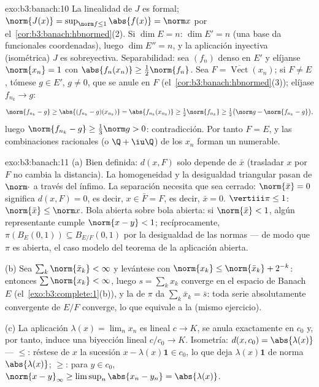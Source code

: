 \begin{solution}{exo:b3:banach:10}
La linealidad de $J$ es formal; $\norm{J(x)} = \sup_{\norm f \leq
1}\abs{f(x)} = \norm x$ por el~\cref{cor:b3:banach:hbnormed}(2). Si
$\dim E = n$: $\dim E' =
n$ (una base da funcionales coordenadas), luego $\dim E'' = n$, y la
aplicación inyectiva (isométrica) $J$ es sobreyectiva. Separabilidad:
sea $(f_n)$ denso en $E'$ y elíjanse $\norm{x_n} = 1$ con
$\abs{f_n(x_n)} \geq \frac12\norm{f_n}$. Sea $F =
\overline{\operatorname{Vect}}(x_n)$; si $F \neq E$, tómese $g
\in E'$, $g \neq 0$, que se anule en $F$
(el~\cref{cor:b3:banach:hbnormed}(3)); elíjase $f_{n_k} \to g$:
\[
\norm{f_{n_k} - g} \geq \abs{(f_{n_k} - g)(x_{n_k})}
= \abs{f_{n_k}(x_{n_k})} \geq \tfrac12\norm{f_{n_k}}
\geq \tfrac12\bigl(\norm g - \norm{f_{n_k} - g}\bigr),
\]
luego $\norm{f_{n_k} - g} \geq \frac13\norm g > 0$: contradicción. Por
tanto $F = E$, y las combinaciones racionales (o $\Q + \iu\Q$) de los
$x_n$ forman un 
numerable.
\end{solution}

\begin{solution}{exo:b3:banach:11}
(a) Bien definida: $d(x, F)$ solo depende de $\bar x$ (trasladar $x$ por
$F$ no cambia la distancia). La homogeneidad y la desigualdad triangular
pasan de $\norm\cdot$ a través del ínfimo. La separación necesita que
sea cerrado: $\norm{\bar
x} = 0$ significa $d(x, F) = 0$, es decir, $x \in \bar F = F$, es decir,
$\bar x = 0$. $\vertiii\pi \leq 1$: $\norm{\bar x} \leq
\norm x$. Bola abierta sobre bola abierta: si $\norm{\bar x} < 1$, algún
representante cumple $\norm{x - y} < 1$; recíprocamente,
$\pi(B_E(0,1)) \subseteq B_{E/F}(0,1)$ por la desigualdad de las normas
--- de modo que $\pi$ es abierta, el caso modelo del teorema de la
aplicación abierta.

(b) Sea $\sum_k\norm{\bar x_k} < \infty$ y levántese con
$\norm{x_k} \leq \norm{\bar x_k} + 2^{-k}$: entonces
$\sum\norm{x_k} < \infty$, luego $s = \sum_kx_k$ converge en el espacio
de Banach $E$ (el~\cref{exo:b3:complete:1}(b)), y la
 de $\pi$ da
$\sum_k\bar x_k = \bar s$: toda serie absolutamente convergente de $E/F$
converge, lo que equivale a la
 (mismo ejercicio).

(c) La aplicación $\lambda(x) = \lim_nx_n$ es lineal $c \to K$, se anula
exactamente en $c_0$ y, por tanto, induce una biyección lineal
$c/c_0 \to K$. Isometría: $d(x, c_0) = \abs{\lambda(x)}$ --- $\leq$:
réstese de $x$ la sucesión $x - \lambda(x)\mathbf
1 \in c_0$, lo que deja $\lambda(x)\mathbf 1$ de norma
$\abs{\lambda(x)}$; $\geq$: para $y \in c_0$, $\norm{x -
y}_\infty \geq \limsup_n\abs{x_n - y_n} = \abs{\lambda(x)}$.
\end{solution}

